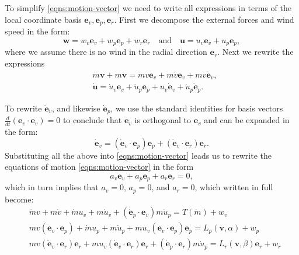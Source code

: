 \documentclass{article}
\renewcommand{\vec}[1]{\boldsymbol{#1}}
\begin{document}
To simplify \eqref{eqns:motion-vector} we need to write all expressions in terms of the local coordinate basis $\vec e_{v}, \vec e_p, \vec e_r$. First we decompose the external forces and wind speed in the form:
\[
\vec w = w_v \vec e_{v} + w_p \vec e_p + w_r \vec e_r \quad \text{and} \quad \vec u = u_v \vec e_{v} + u_p \vec e_p,
\]
where we assume there is no wind in the radial direction $\vec e_r$. Next we rewrite the expressions
\begin{align}
    & \dot m \vec v +  m \dot{\vec v} = \dot m v \vec e_{v} +  m \dot{v} \vec e_{v} +  m v \dot{\vec e}_{v},
    \\
    & \dot{\vec u} = \dot u_v \vec e_{v} + \dot u_p \vec e_p + u_v \dot{\vec e}_{v} + \dot u_p \dot{\vec e}_p.
\end{align}

To rewrite $\dot{\vec{e}}_{v}$, and likewise $\dot{\vec{e}}_{p}$, we use the standard identities for basis vectors $\frac{d}{dt}(\vec e_{v} \cdot \vec e_{v})=0$
to conclude that $\dot{\vec{e}}_{v}$ is orthogonal to ${\vec{e}}_{v}$ and can be expanded in the form:
\[
\dot{\vec{e}}_{v} =  (\dot{\vec{e}}_{v} \cdot \vec{e}_p)\vec{e}_p + (\dot{\vec{e}}_{v} \cdot \vec{e}_r)\vec{e}_r.
\] 
Substituting all the above into \eqref{eqns:motion-vector} leads us to rewrite the equations of motion \eqref{eqns:motion-vector} in the form 
\[ 
a_v \vec e_{v} + a_p \vec e_p + a_r \vec e_r = 0,
\]
which in turn implies that $a_v =0$, $a_p =0$, and $a_r =0$, which written in full become:
\begin{align} 
    & \dot m v  +  m \dot{v} + \dot{m} u_v +  m \dot u_v + (\dot{\vec{e}}_{p} \cdot \vec{e}_v)m \dot u_p   = T(\dot{m}) + w_v
    \\
    & m v (\dot{\vec{e}}_{v} \cdot \vec{e}_p) + \dot{m} u_p + m \dot u_p +
    m u_v (\dot{\vec{e}}_{v} \cdot \vec{e}_p)\vec{e}_p
    =   {L_p}(\vec v, \alpha)  + w_p
    \\
    & m v (\dot{\vec{e}}_{v} \cdot \vec{e}_r)\vec{e}_r + m u_v (\dot{\vec{e}}_{v} \cdot \vec{e}_r)\vec{e}_r 
    + (\dot{\vec{e}}_{p} \cdot \vec{e}_r) m \dot u_p  = {L_r}(\vec v,\beta) \vec{e}_r + w_r
\end{align}
\end{document}
